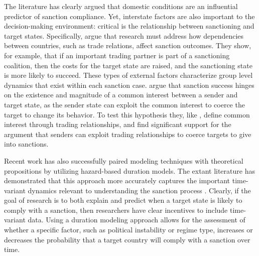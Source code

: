 The literature has clearly argued that domestic conditions are an influential predictor of sanction compliance. Yet, interstate factors are also important to the decision-making environment: critical is the relationship between sanctioning and target states. Specifically, \cite{mclean2010friends} argue that research must address how dependencies between countries, such as trade relations, affect sanction outcomes. They show, for example, that if an important trading partner is part of a sanctioning coalition, then the costs for the target state are raised, and the sanctioning state is more likely to succeed. These types of external factors characterize group level dynamics that exist within each sanction case. \citet{whang2013coercion} argue that sanction success hinges on the existence and magnitude of a common interest between a sender and target state, as the sender state can exploit the common interest to coerce the target to change its behavior. To test this hypothesis they, like \cite{mclean2010friends}, define common interest through trading relationships, and find significant support for the argument that senders can exploit trading relationships to coerce targets to give into sanctions.

Recent work has also successfully paired modeling techniques with theoretical propositions by utilizing hazard-based duration models. The extant literature has demonstrated that this approach more accurately captures the important time-variant dynamics relevant to understanding the sanction process \citep{bolks2000}. Clearly, if the goal of research is to both explain and predict when a target state is likely to comply with a sanction, then researchers have clear incentives to include time-variant data. Using a duration modeling approach allows for the assessment of whether a specific factor, such as political instability or regime type, increases or decreases the probability that a target country will comply with a sanction over time.

